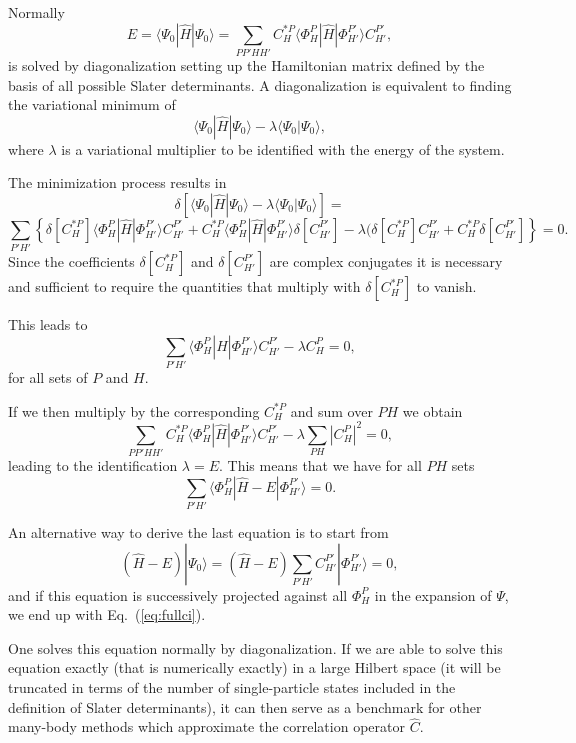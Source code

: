 Normally 
\[
E= \langle \Psi_0 | \hat{H} |\Psi_0 \rangle= \sum_{PP'HH'}C_H^{*P}\langle \Phi_H^P | \hat{H} |\Phi_{H'}^{P'} \rangle C_{H'}^{P'},
\]
is solved by diagonalization setting up the Hamiltonian matrix defined by the basis of all possible Slater determinants. A diagonalization
is equivalent to finding the variational minimum   of 
\[
 \langle \Psi_0 | \hat{H} |\Psi_0 \rangle-\lambda \langle \Psi_0 |\Psi_0 \rangle,
\]
where $\lambda$ is a variational multiplier to be identified with the energy of the system.

The minimization process results in 
\[
\delta\left[ \langle \Psi_0 | \hat{H} |\Psi_0 \rangle-\lambda \langle \Psi_0 |\Psi_0 \rangle\right]=
\]
\[
\sum_{P'H'}\left\{\delta[C_H^{*P}]\langle \Phi_H^P | \hat{H} |\Phi_{H'}^{P'} \rangle C_{H'}^{P'}+
C_H^{*P}\langle \Phi_H^P | \hat{H} |\Phi_{H'}^{P'} \rangle \delta[C_{H'}^{P'}]-
\lambda( \delta[C_H^{*P}]C_{H'}^{P'}+C_H^{*P}\delta[C_{H'}^{P'}]\right\} = 0.
\]
Since the coefficients $\delta[C_H^{*P}]$ and $\delta[C_{H'}^{P'}]$ are complex conjugates it is necessary and sufficient to require the quantities that multiply with $\delta[C_H^{*P}]$ to vanish.  

This leads to 
\[
\sum_{P'H'}\langle \Phi_H^P | \hat{H} |\Phi_{H'}^{P'} \rangle C_{H'}^{P'}-\lambda C_H^{P}=0,
\]
for all sets of $P$ and $H$.

If we then multiply by the corresponding $C_H^{*P}$ and sum over $PH$ we obtain
\[ 
\sum_{PP'HH'}C_H^{*P}\langle \Phi_H^P | \hat{H} |\Phi_{H'}^{P'} \rangle C_{H'}^{P'}-\lambda\sum_{PH}|C_H^P|^2=0,
\]
leading to the identification $\lambda = E$. This means that we have for all $PH$ sets
\begin{equation}
\sum_{P'H'}\langle \Phi_H^P | \hat{H} -E|\Phi_{H'}^{P'} \rangle = 0. \label{eq:fullci}
\end{equation}



An alternative way to derive the last equation is to start from 
\[
(\hat{H} -E)|\Psi_0\rangle = (\hat{H} -E)\sum_{P'H'}C_{H'}^{P'}|\Phi_{H'}^{P'} \rangle=0, 
\]
and if this equation is successively projected against all $\Phi_H^P$ in the expansion of $\Psi$, we end up with Eq.~(\ref{eq:fullci}).

One solves this equation normally by diagonalization. If we are able to solve this equation exactly (that is
numerically exactly) in a large Hilbert space (it will be truncated in terms of the number of single-particle states included in the definition
of Slater determinants), it can then serve as a benchmark for other many-body methods which approximate the correlation operator
$\hat{C}$.  


